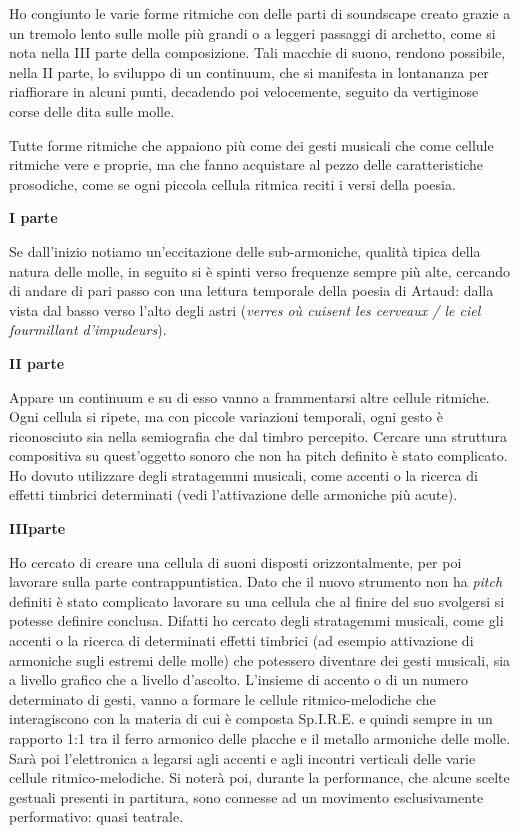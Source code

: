 Ho congiunto le varie forme ritmiche con delle parti di soundscape creato grazie a un tremolo lento sulle molle più grandi o a leggeri passaggi di archetto, come si nota nella III parte della composizione. Tali macchie di suono, rendono possibile, nella II parte, lo sviluppo di un continuum, che si manifesta in lontananza per riaffiorare in alcuni punti, decadendo poi velocemente, seguito da vertiginose corse delle dita sulle molle.

Tutte forme ritmiche che appaiono più come dei gesti musicali che come cellule ritmiche vere e proprie, ma che fanno acquistare al pezzo delle caratteristiche prosodiche, come se ogni piccola cellula ritmica reciti i versi della poesia.

\textbf{I parte}

Se dall'inizio notiamo un'eccitazione delle sub-armoniche, qualità tipica della natura delle molle, in seguito si è spinti verso frequenze sempre più alte, cercando di andare di pari passo con una lettura temporale della poesia di Artaud: dalla vista dal basso verso l'alto degli astri (\textit{verres où cuisent les cerveaux / le ciel fourmillant d'impudeurs}).

\textbf{II parte}

Appare un continuum e su di esso vanno a frammentarsi altre cellule ritmiche. Ogni cellula si ripete, ma con piccole variazioni temporali, ogni gesto è riconosciuto sia nella semiografia che dal timbro percepito.
Cercare una struttura compositiva su quest'oggetto sonoro che non ha pitch definito è stato complicato. Ho dovuto utilizzare degli stratagemmi musicali, come accenti o la ricerca di effetti timbrici determinati (vedi l'attivazione delle armoniche più acute).

\textbf{IIIparte}

Ho cercato di creare una cellula di suoni disposti orizzontalmente, per poi lavorare sulla parte contrappuntistica. Dato che il nuovo strumento non ha \textit{pitch} definiti è stato complicato lavorare su una cellula che al finire del suo svolgersi si potesse definire conclusa. Difatti ho cercato degli stratagemmi musicali, come gli accenti o la ricerca di determinati effetti timbrici (ad esempio attivazione di armoniche sugli estremi delle molle) che potessero diventare dei gesti musicali, sia a livello grafico che a livello d'ascolto. L'insieme di accento o di un numero determinato di gesti, vanno a formare le cellule ritmico-melodiche che interagiscono con la materia di cui è composta Sp.I.R.E. e quindi sempre in un rapporto 1:1 tra il ferro armonico delle placche e il metallo armoniche delle molle.
Sarà poi l'elettronica a legarsi agli accenti e agli incontri verticali delle varie cellule ritmico-melodiche. Si noterà poi, durante la performance, che alcune scelte gestuali presenti in partitura, sono connesse ad un movimento esclusivamente performativo: quasi teatrale.

